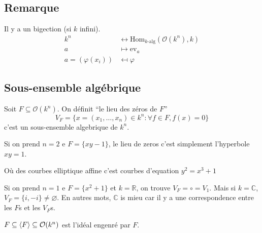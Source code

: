 \subsection{Remarque}

Il y a un bigection (si \(k\) infini).
\begin{align*}{}
    k^{n} &\leftrightarrow \mathrm{Hom}_{k\text{-alg}} {(\mathcal{O}{(k^{n})},
    k)}\\
        a &\mapsto \mathrm{ev}_a \\
        a = {(\varphi {(x_{i})})} &\mapsfrom  \varphi 
\end{align*}

\subsection{Sous-ensemble algébrique}

Soit \(F \subseteq \mathcal{O}{(k^{n})}\). On définit ``le lieu des zéros de \(F\)''
\[
  V_F = \{x = {(x_{1}, \dots, x_{n})} \in k^{n} : \forall f \in F, f{(x)} = 0\} 
\]
c'est un sous-ensemble algebrique de \(k^{n}\).

\begin{example}{}
    Si on prend \(n=2\) e \(F = \{xy - 1\}\), le lieu de zeros c'est simplement
    l'hyperbole \(xy = 1\).
    \begin{figure}[ht]
        \centering
    \end{figure}
    Où des courbes elliptique affine c'est courbes d'equation \(y^2 = x^3 + 1\) 
\end{example}

Si on prend \(n=1\) e \(F = \{x^2 + 1\} \) et \(k = \mathbb{R}\), on trouve
\(V_F = \circ = V_{1} \). Mais si \(k = \mathbb{C}\), \(V_F = \{i, -i\} \neq
\varnothing\). En autres mots, \(\mathbb{C}\) is mieu car il y a une
correspondence entre les \(F\)s et les \(V_F\)s.

\begin{note}[zione]
    \(F \subseteq  {\left\langle F\right\rangle} \subseteq \mathcal{O}{(k^{n})} \) est l'idéal
    engenré par \(F\).
\end{note}

